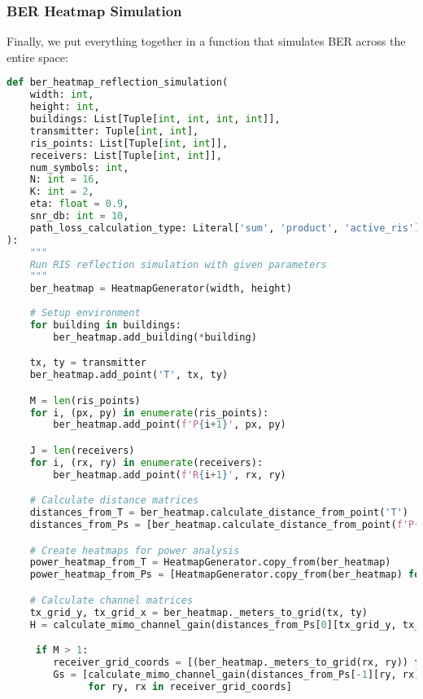 \subsubsection{BER Heatmap Simulation}

Finally, we put everything together in a function that simulates BER across the entire space:

\begin{lstlisting}[language=python, caption={BER Heatmap Simulation}]
def ber_heatmap_reflection_simulation(
    width: int,
    height: int,
    buildings: List[Tuple[int, int, int, int]],
    transmitter: Tuple[int, int],
    ris_points: List[Tuple[int, int]],
    receivers: List[Tuple[int, int]],
    num_symbols: int,
    N: int = 16,
    K: int = 2,
    eta: float = 0.9,
    snr_db: int = 10,
    path_loss_calculation_type: Literal['sum', 'product', 'active_ris'] = 'sum'
):
    """
    Run RIS reflection simulation with given parameters
    """
    ber_heatmap = HeatmapGenerator(width, height)
    
    # Setup environment
    for building in buildings:
        ber_heatmap.add_building(*building)

    tx, ty = transmitter
    ber_heatmap.add_point('T', tx, ty)

    M = len(ris_points)
    for i, (px, py) in enumerate(ris_points):
        ber_heatmap.add_point(f'P{i+1}', px, py)

    J = len(receivers)
    for i, (rx, ry) in enumerate(receivers):
        ber_heatmap.add_point(f'R{i+1}', rx, ry)

    # Calculate distance matrices
    distances_from_T = ber_heatmap.calculate_distance_from_point('T')
    distances_from_Ps = [ber_heatmap.calculate_distance_from_point(f'P{i+1}') for i in range(M)]

    # Create heatmaps for power analysis
    power_heatmap_from_T = HeatmapGenerator.copy_from(ber_heatmap)
    power_heatmap_from_Ps = [HeatmapGenerator.copy_from(ber_heatmap) for _ in range(M)]

    # Calculate channel matrices
    tx_grid_y, tx_grid_x = ber_heatmap._meters_to_grid(tx, ty)
    H = calculate_mimo_channel_gain(distances_from_Ps[0][tx_grid_y, tx_grid_x], K, N)

     if M > 1:
        receiver_grid_coords = [(ber_heatmap._meters_to_grid(rx, ry)) for rx, ry in receivers]
        Gs = [calculate_mimo_channel_gain(distances_from_Ps[-1][ry, rx], N, K) 
              for ry, rx in receiver_grid_coords]


\end{lstlisting}
